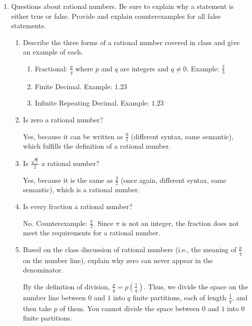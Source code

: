 \documentclass[letterpaper,12pt,fleqn]{article}
\begin{document}
\begin{enumerate}
\item Questions about rational numbers. Be sure to explain why a statement is
  either true or false. Provide and explain counterexamples for all false
  statements.
  \begin{enumerate}
  \item Describe the three forms of a rational number covered in class and give
    an example of each.

    \begin{enumerate}[label={\arabic*.}]
    \item Fractional: $\frac{p}{q}$ where $p$ and $q$ are integers and
      $q\ne0$. Example: $\frac{2}{3}$

    \item Finite Decimal. Example: $1.23$

    \item Infinite Repeating Decimal. Example: $1.\overline{23}$
    \end{enumerate}

  \item Is zero a rational number?

    Yes, because it can be written as $\frac{0}{1}$ (different syntax, same
    semantic), which fulfills the definition of a rational number.

  \item Is $\frac{\sqrt{9}}{2}$ a rational number?

    Yes, because it is the same as $\frac{3}{2}$ (once again, different syntax,
    same semantic), which is a rational number.

  \item Is every fraction a rational number?

    No. Counterexample: $\frac{\pi}{2}$. Since $\pi$ is not an integer, the
    fraction does not meet the requirements for a rational number.

  \item Based on the class discussion of rational numbers (i.e., the meaning
    of $\frac{p}{q}$ on the number line), explain why zero can never appear in
    the denominator.

    By the definition of division, $\frac{p}{q}=p\left(\frac{1}{q}\right)$.
    Thus, we divide the space on the number line between $0$ and $1$ into
    $q$ finite partitions, each of length $\frac{1}{q}$, and then take $p$ of
    them. You cannot divide the space between $0$ and $1$ into $0$ finite
    partitions.
  \end{enumerate}


\end{enumerate}
\end{document}
